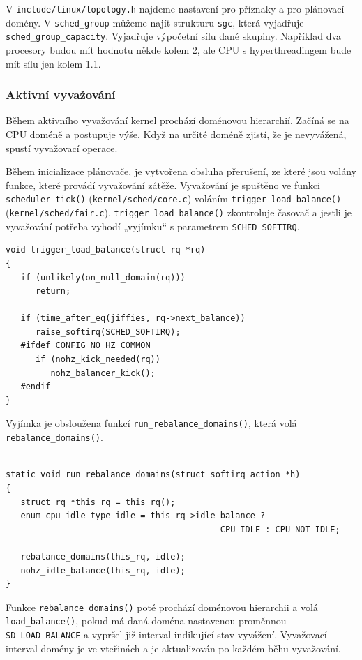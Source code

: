 \documentclass[a4paper,12pt]{article}
\begin{document}
V \verb#include/linux/topology.h# najdeme nastavení pro příznaky a pro plánovací domény. V \verb#sched_group# můžeme najít strukturu \verb#sgc#, která vyjadřuje \verb#sched_group_capacity#. Vyjadřuje výpočetní sílu dané skupiny. Například dva procesory budou mít hodnotu někde kolem 2, ale CPU s hyperthreadingem bude mít sílu jen kolem 1.1. 

\subsubsection{Aktivní vyvažování}

Během aktivního vyvažování kernel prochází doménovou hierarchií. Začíná se na CPU doméně a postupuje výše. Když na určité doméně zjistí, že je nevyvážená, spustí vyvažovací operace.

Během inicializace plánovače, je vytvořena obsluha přerušení, ze které jsou volány funkce, které provádí vyvažování zátěže. Vyvažování je spuštěno ve funkci \verb#scheduler_tick()# (\verb#kernel/sched/core.c#) voláním \linebreak \verb#trigger_load_balance()# (\verb#kernel/sched/fair.c#). \verb#trigger_load_balance()# zkontroluje časovač a jestli je vyvažování potřeba vyhodí „vyjímku“ s parametrem \verb#SCHED_SOFTIRQ#.

\begin{verbatim} 
void trigger_load_balance(struct rq *rq)
{
   if (unlikely(on_null_domain(rq)))
      return;

   if (time_after_eq(jiffies, rq->next_balance))
      raise_softirq(SCHED_SOFTIRQ);
   #ifdef CONFIG_NO_HZ_COMMON
      if (nohz_kick_needed(rq))
         nohz_balancer_kick();
   #endif
}
\end{verbatim} 

Vyjímka je obsloužena funkcí \verb#run_rebalance_domains()#, která volá \linebreak \verb#rebalance_domains()#. 

\begin{verbatim} 

static void run_rebalance_domains(struct softirq_action *h)
{
   struct rq *this_rq = this_rq();
   enum cpu_idle_type idle = this_rq->idle_balance ?
                                           CPU_IDLE : CPU_NOT_IDLE;

   rebalance_domains(this_rq, idle);
   nohz_idle_balance(this_rq, idle);
}

\end{verbatim} 

Funkce \verb#rebalance_domains()# poté prochází doménovou hierarchii a volá \verb#load_balance()#, pokud má daná doména nastavenou proměnnou \linebreak \verb#SD_LOAD_BALANCE# a vypršel již interval indikující stav vyvážení. Vyvažovací interval domény je ve vteřinách a je aktualizován po každém běhu vyvažování.
\end{document}
